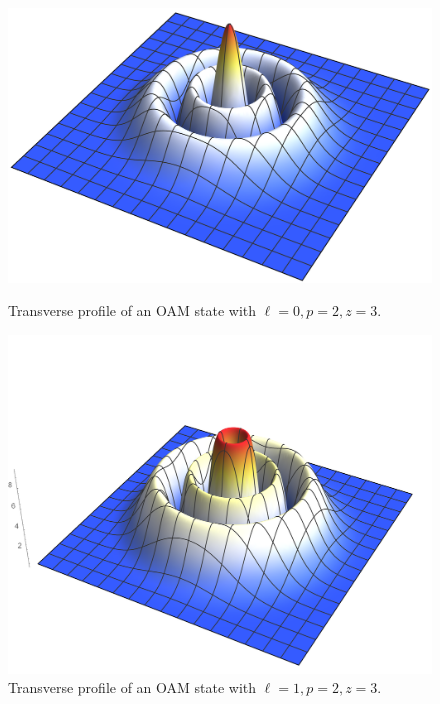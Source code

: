 \begin{figure}
    \centering
    \begin{minipage}{0.45\textwidth}
        \centering
        \includegraphics[width=1\textwidth]{Figures/OAM/LGBeamProfile_L0P2Z03.png} %
        \caption{Transverse profile of an OAM state with $\ell=0, p=2, z=3$.}
        \label{fig:expQWs:gaussian_profile_L0P2Z03}
    \end{minipage}\hfill
    \begin{minipage}{0.45\textwidth}
        \centering
        \includegraphics[width=1\textwidth]{Figures/OAM/LGBeamProfile_L1P2Z03.png} %
        \caption{Transverse profile of an OAM state with $\ell=1, p=2, z=3$.}
        \label{fig:expQWs:gaussian_profile_L1P2Z03}
    \end{minipage}
\end{figure}

